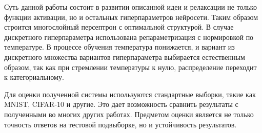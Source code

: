 \documentclass[12pt,twoside]{article}
\begin{document}
Суть данной работы состоит в развитии описанной идеи и релаксации не только функции активации, но и остальных гиперпараметров нейросети. Таким образом строится многослойный персептрон с оптимальной структурой. В случае дискретного гиперпараметра использована репараметризация с нормировкой по температуре\cite{softmax}. В процессе обучения температура понижается, и вариант из дискретного множества вариантов гиперпараметра выбирается естественным образом, так как при стремлении температуры к нулю, распределение переходит к категориальному.

Для оценки полученной системы используются стандартные выборки, такие как MNIST\cite{lecun-mnist}, CIFAR-10 и другие. Это дает возможность сравнить результаты с полученными во многих других работах. Предметом оценки является не только точность ответов на тестовой подвыборке, но и устойчивость результатов.



\end{document}
